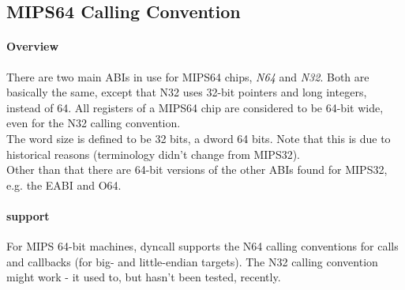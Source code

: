 %
%
%
%

\subsection{MIPS64 Calling Convention}

\paragraph{Overview}

There are two main ABIs in use for MIPS64 chips, \emph{N64}\cite{MIPSn32/n64} and \emph{N32}\cite{MIPSn32/n64}. Both are
basically the same, except that N32 uses 32-bit pointers and long integers, instead of 64. All registers of a MIPS64 chip are considered
to be 64-bit wide, even for the N32 calling convention.\\
The word size is defined to be 32 bits, a dword 64 bits. Note that this is due to historical reasons (terminology didn't change from MIPS32).\\
Other than that there are 64-bit versions of the other ABIs found for MIPS32, e.g. the EABI\cite{MIPSeabi} and O64\cite{MIPSo64}.

\paragraph{ support}

For MIPS 64-bit machines, dyncall supports the N64 calling conventions for calls and callbacks (for big- and little-endian targets).
The N32 calling convention might work - it used to, but hasn't been tested, recently.

